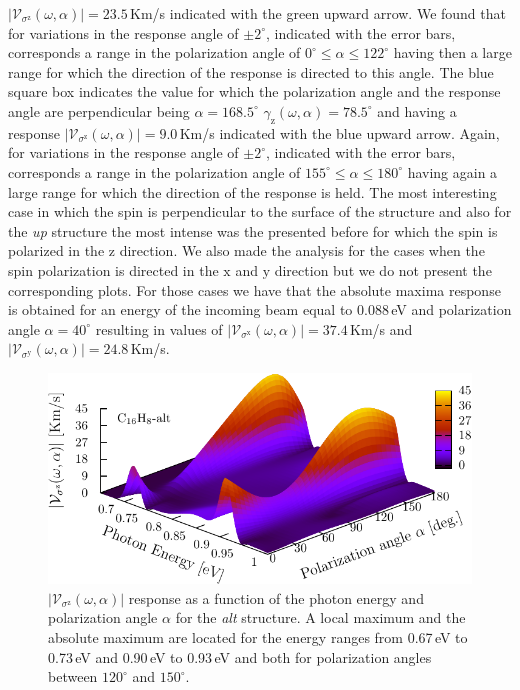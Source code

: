 \documentclass[prb,11pt,tightenlines,twocolumn,aps]{revtex4-1}
\begin{document}
$|\mathcal{V}_{\sigma^{\mathrm{z}}}(\omega,\alpha)|=23.5$\,Km/s indicated with
the green upward arrow. We found that for variations in the response angle of
$\pm 2^{\circ}$, indicated with the error bars, corresponds a range in the
polarization angle of $0^{\circ} \leq \alpha \leq 122^{\circ}$ having then a
large range for which the direction of the response is directed to this angle.
% 
The blue square box indicates the value for which the polarization angle and the
response angle are perpendicular being $\alpha=168.5^{\circ}$
$\gamma_{\mathrm{z}}(\omega,\alpha)=78.5^{\circ}$ and having a response
$|\mathcal{V}_{\sigma^{\mathrm{z}}}(\omega,\alpha)|=9.0$\,Km/s indicated with
the blue upward arrow. Again, for variations in the response angle of
$\pm2^{\circ}$, indicated with the error bars, corresponds a range in the
polarization angle of $155^{\circ} \leq \alpha \leq 180^{\circ}$ having again a
large range for which the direction of the response is held.
% 
The most interesting case in which the spin is perpendicular to the surface of
the structure and also for the \emph{up} structure the most intense was the
presented before for which the spin is polarized in the $\mathrm{z}$ direction.
We also made the analysis for the cases when the spin polarization is directed
in the $\mathrm{x}$ and $\mathrm{y}$ direction but we do not present the
corresponding plots. For those cases we have that the absolute maxima response
is obtained for an energy of the incoming beam equal to 0.088\,eV and
polarization angle $\alpha=40^{\circ}$ resulting in values of
$|\mathcal{V}_{\sigma^{\mathrm{x}}}(\omega,\alpha)|=37.4$\,Km/s and
$|\mathcal{V}_{\sigma^{\mathrm{y}}}(\omega,\alpha)|=24.8$\,Km/s.


\begin{figure}[tb]
    \centering
    \includegraphics[width=\linewidth]{altplots/alt-3d-svaz}
    \caption{$|\mathcal{V}_{\sigma^{\mathrm{z}}}(\omega,\alpha)|$ response
    as a function of the photon energy and polarization angle $\alpha$  for the
    \emph{alt} structure. A local maximum and the absolute maximum are located
    for the energy ranges from 0.67\,eV to 0.73\,eV and 0.90\,eV to 0.93\,eV and
    both for polarization angles between $120^{\circ}$ and $150^{\circ}$.}
    \label{fig:alt-3d-vsb}
\end{figure}
\end{document}
